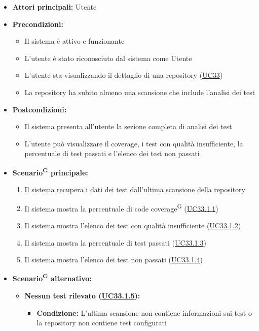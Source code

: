 \documentclass[a4paper, 11pt]{article}
\begin{document}
\begin{itemize}
    \item \textbf{Attori principali:} Utente
    \item \textbf{Precondizioni:}
    \begin{itemize}
        \item Il sistema è attivo e funzionante
        \item L'utente è stato riconosciuto dal sistema come Utente
        \item L'utente sta visualizzando il dettaglio di una repository (\hyperref[UC33]{UC33})
        \item La repository ha subito almeno una scansione che include l'analisi dei test
    \end{itemize}
    \item \textbf{Postcondizioni:}
    \begin{itemize}
        \item Il sistema presenta all'utente la sezione completa di analisi dei test
        \item L'utente può visualizzare il coverage, i test con qualità insufficiente, la percentuale di test passati e l'elenco dei test non passati
    \end{itemize}
    \item \textbf{Scenario\textsuperscript{G} principale:}
    \begin{enumerate}
        \item Il sistema recupera i dati dei test dall'ultima scansione della repository
        \item Il sistema mostra la percentuale di code coverage\textsuperscript{G} (\hyperref[UC33.1.1]{UC33.1.1})
        \item Il sistema mostra l'elenco dei test con qualità insufficiente (\hyperref[UC33.1.2]{UC33.1.2})
        \item Il sistema mostra la percentuale di test passati (\hyperref[UC33.1.3]{UC33.1.3})
        \item Il sistema mostra l'elenco dei test non passati (\hyperref[UC33.1.4]{UC33.1.4})
    \end{enumerate}
    \item \textbf{Scenario\textsuperscript{G} alternativo:}
    \begin{itemize}
        \item \textbf{Nessun test rilevato (\hyperref[UC33.1.5]{UC33.1.5}):}
        \begin{itemize}
            \item \textbf{Condizione:} L'ultima scansione non contiene informazioni sui test o la repository non contiene test configurati

\end{itemize}
\end{itemize}
\end{itemize}
\end{document}

